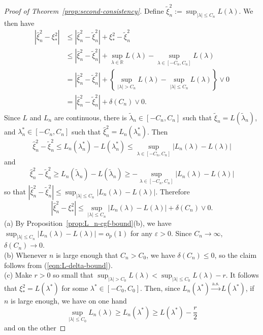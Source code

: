 \documentclass{article}
\theoremstyle{definition}
\newcommand*\eps{\epsilon}
\renewcommand*\epsilon{\varepsilon}
\newcommand{\R}{\mathbb{R}}
\newcommand{\1}{\mathbbm{1}}
\begin{document}
\begin{proof}[Proof of Theorem~\ref{prop:second-consistency}]
Define $\tilde \xi_n^2 := \sup_{|\lambda|\leq C_n} L(\lambda)$. We then have 
\begin{align*}
    |\hat \xi^2_n - \xi^2_*| &\leq |\hat \xi^2_n - \tilde \xi^2_n| + \xi_*^2 - \tilde \xi_n^2 \\
    &\leq |\hat \xi^2_n - \tilde \xi^2_n| + \sup_{\lambda \in \R} L(\lambda) - \sup_{\lambda \in [-C_n, C_n]} L(\lambda) \\
    &= |\hat \xi^2_n - \tilde \xi^2_n| + \left\{ \sup_{|\lambda| > C_n} L(\lambda) - \sup_{|\lambda| \leq C_n} L(\lambda)\right\} \vee 0 \\
    &= |\hat \xi^2_n - \tilde \xi_n^2| + \delta(C_n) \vee 0.
\end{align*}
    Since $L$ and $L_n$ are continuous, there is $\tilde \lambda_n \in [-C_n, C_n]$ such that $\tilde \xi_n = L(\tilde \lambda_n)$, and $\lambda^*_n \in [-C_n, C_n]$ such that $\hat \xi_n^2 = L_n(\lambda^*_n)$. Then 
    \[
    \hat \xi_n^2 - \tilde \xi_n^2 \leq L_n(\lambda^*_n) - L(\lambda^*_n) \leq \sup_{\lambda \in [-C_n, C_n]} |L_n(\lambda) - L(\lambda)|
    \]
    and 
    \[
    \hat \xi_n^2 - \tilde \xi_n^2 \geq L_n(\tilde \lambda_n) - L(\tilde \lambda_n) \geq -\sup_{\lambda \in [-C_n, C_n]}|L_n(\lambda) - L(\lambda)| 
    \]
    so that $|\hat \xi_n^2 - \tilde \xi^2_n| \leq \sup_{|\lambda| \leq C_n} |L_n(\lambda) - L(\lambda)|$. Therefore 
    \begin{equation}
        |\hat \xi^2_n - \xi_*^2| \leq \sup_{|\lambda| \leq C_n} |L_n(\lambda) - L(\lambda)| + \delta(C_n) \vee 0.
        \label{eqn:L-delta-bound}
    \end{equation}
    (a) By Proposition~\ref{prop:L_n-cgf-bound}(b), we have $\sup_{|\lambda| \leq C_n} |L_n(\lambda) - L(\lambda)| = o_p(1)$ for any $\eps > 0$. Since $C_n \to \infty$, $\delta(C_n) \to 0$. \\
    (b) Whenever $n$ is large enough that $C_n > C_0$, we have $\delta(C_n) \leq 0$, so the claim follows from (\ref{eqn:L-delta-bound}). \\
    (c) Make $r > 0$ so small that $\sup_{|\lambda| > C_0} L(\lambda) < \sup_{|\lambda| \leq C_0} L(\lambda) - r$. It follows that $\xi_*^2 = L(\lambda^*)$ for some $\lambda^* \in [-C_0, C_0]$. Then, since $L_n(\lambda^*) \xrightarrow{\mathrm{a.s.}} L(\lambda^*)$, if $n$ is large enough, we have on one hand
    \[
    \sup_{|\lambda| \leq C_0} L_n(\lambda) \geq L_n(\lambda^*) \geq L(\lambda^*) - \frac r2
    \]
    and on the other

\end{proof}
\end{document}
